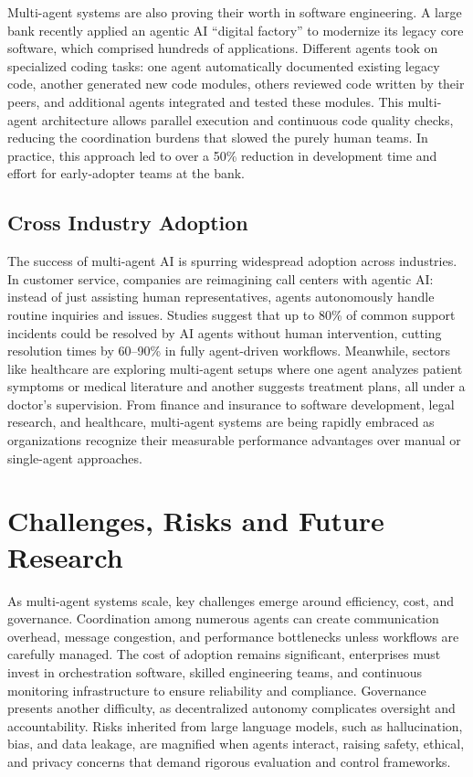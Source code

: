 \documentclass[conference]{IEEEtran}
\begin{document}
Multi-agent systems are also proving their worth in software engineering. A large bank recently applied an agentic AI “digital factory” \cite{mckinsey25} to modernize its legacy core software, which comprised hundreds of applications. Different agents took on specialized coding tasks: one agent automatically documented existing legacy code, another generated new code modules, others reviewed code written by their peers, and additional agents integrated and tested these modules. This multi-agent architecture allows parallel execution and continuous code quality checks, reducing the coordination burdens that slowed the purely human teams. In practice, this approach led to over a 50\% reduction in development time and effort for early-adopter teams at the bank.

\subsection{Cross Industry Adoption}

The success of multi-agent AI is spurring widespread adoption across industries. In customer service, companies are reimagining call centers with agentic AI: instead of just assisting human representatives, agents autonomously handle routine inquiries and issues. Studies suggest that up to 80\% of common support incidents could be resolved by AI agents without human intervention, cutting resolution times by 60–90\% in fully agent-driven workflows. Meanwhile, sectors like healthcare are exploring multi-agent setups where one agent analyzes patient symptoms or medical literature and another suggests treatment plans, all under a doctor’s supervision. From finance and insurance to software development, legal research, and healthcare, multi-agent systems are being rapidly embraced as organizations recognize their measurable performance advantages over manual or single-agent approaches. 


\section{Challenges, Risks and Future Research}

As multi-agent systems scale, key challenges emerge around efficiency, cost, and governance. Coordination among numerous agents can create communication overhead, message congestion, and performance bottlenecks unless workflows are carefully managed. The cost of adoption remains significant, enterprises must invest in orchestration software, skilled engineering teams, and continuous monitoring infrastructure to ensure reliability and compliance. Governance presents another difficulty, as decentralized autonomy complicates oversight and accountability. Risks inherited from large language models, such as hallucination, bias, and data leakage, are magnified when agents interact, raising safety, ethical, and privacy concerns that demand rigorous evaluation and control frameworks.
\end{document}

